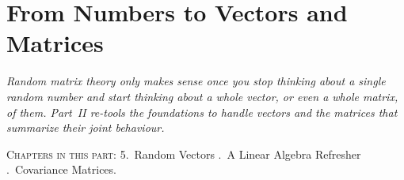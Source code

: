 \part{From Numbers to Vectors and Matrices}

\begin{fullwidth}
\noindent\textit{Random matrix theory only makes sense once you stop thinking about a single random number and start thinking about a whole vector, or even a whole matrix, of them. Part~II re-tools the foundations to handle vectors and the matrices that summarize their joint behaviour.}

\medskip
\noindent\textsc{Chapters in this part:} 5.~Random Vectors .~A Linear Algebra Refresher .~Covariance Matrices.
\end{fullwidth}
